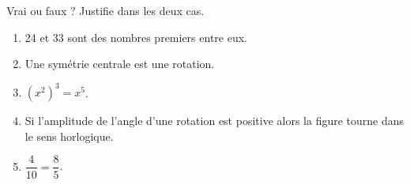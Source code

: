 \pagebreak
\begin{exercise}[points=5]
    Vrai ou faux ? Justifie dans les deux cas.
    \begin{enumerate}
        \item 24 et 33 sont des nombres premiers entre eux.
        \par\blank[width=2\linewidth,linespread=1.5]{}
        \item Une symétrie centrale est une rotation.
        \par\blank[width=2\linewidth,linespread=1.5]{}
        \item $\left(x^2\right)^3 = x^5$.
        \par\blank[width=2\linewidth,linespread=1.5]{}
        \item Si l'amplitude de l'angle d'une rotation est positive alors la figure tourne dans le sens horlogique.
        \par\blank[width=2\linewidth,linespread=1.5]{}
        \item $\dfrac{4}{10}=\dfrac{8}{5}$.
        \par\blank[width=2\linewidth,linespread=1.5]{}
    \end{enumerate}
\end{exercise}
\begin{solution}

\end{solution}
